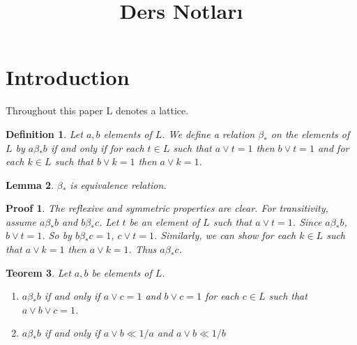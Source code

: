 \documentclass[a4paper,12pt]{article}
\title{Ders Notları}
\date{}
\numberwithin{equation}{section}
\theoremstyle{italik}
\newtheorem{teorem}{Teorem}[section]
\newtheorem{lemma}[teorem]{Lemma}
\newtheorem{tanim}[teorem]{Definition}
\newtheorem*{ispat}{Proof}
\begin{document}
\section{Introduction}
Throughout this paper L denotes a lattice.

\begin{tanim} \label{1}
  Let $ a,b $ elements of $ L $. We define a relation $ \beta_* $ on the elements of $ L $ by 
  $ a \beta_* b $ if and only if for each $ t \in L $ such that $ a \vee t = 1 $ then $ b \vee t = 1 $ and for each 
  $ k \in L $ such that $ b \vee k = 1 $ then $ a \vee k = 1 $.
\end{tanim}

\begin{lemma} \label{2}
  $ \beta_* $ is equivalence relation.
\end{lemma}
\begin{ispat}
  The reflexive and symmetric properties are clear. For transitivity, assume $ a \beta_*b $ and $ b \beta_* c $. Let 
  $ t $ be an element of $ L $ such that $ a \vee t = 1 $. Since $ a \beta_*b $, $ b \vee t = 1 $. So by $ b \beta_* c = 1 $, 
  $ c \vee t = 1 $. Similarly, we can show for each $ k \in L $ such that $ a \vee k = 1 $ then $ a \vee k=1 $. 
  Thus $ a \beta_* c $.

\end{ispat}

\begin{teorem} \label{3}
  Let $ a,b $ be elements of $ L $. 
  \begin{enumerate}
    \item
      $ a \beta_* b $ if and only if $ a \vee c = 1 $ and $ b \vee c = 1 $ for each $ c \in L $ 
      such that $ a \vee b  \vee c = 1 $.
    \item
      $ a \beta_* b $ if and only if $ a \vee b \ll 1/a $ and $ a \vee b \ll 1/b $
  \end{enumerate}
\end{teorem}
\end{document}
